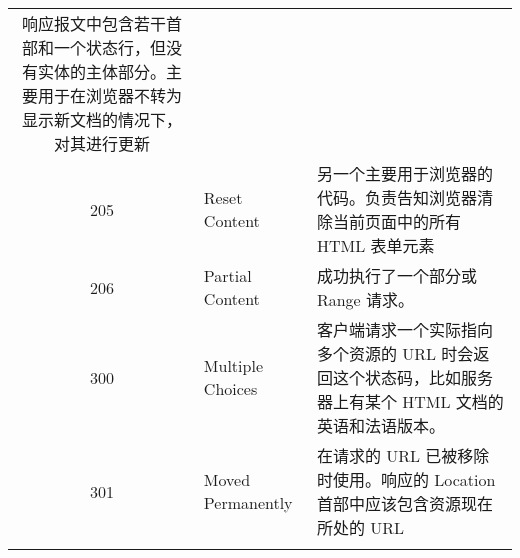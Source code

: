 \begin{longtable}[]{@{}cll@{}}
\begin{minipage}[t]{0.30\columnwidth}
响应报文中包含若干首部和一个状态行，但没有实体的主体部分。主要用于在浏览器不转为显示新文档的情况下，对其进行更新\strut
\end{minipage}\tabularnewline
\begin{minipage}[t]{0.32\columnwidth}\centering\strut
205\strut
\end{minipage} & \begin{minipage}[t]{0.30\columnwidth}\raggedright\strut
Reset Content\strut
\end{minipage} & \begin{minipage}[t]{0.30\columnwidth}\raggedright\strut
另一个主要用于浏览器的代码。负责告知浏览器清除当前页面中的所有 HTML
表单元素\strut
\end{minipage}\tabularnewline
\begin{minipage}[t]{0.32\columnwidth}\centering\strut
206\strut
\end{minipage} & \begin{minipage}[t]{0.30\columnwidth}\raggedright\strut
Partial Content\strut
\end{minipage} & \begin{minipage}[t]{0.30\columnwidth}\raggedright\strut
成功执行了一个部分或 Range 请求。\strut
\end{minipage}\tabularnewline
\begin{minipage}[t]{0.32\columnwidth}\centering\strut
300\strut
\end{minipage} & \begin{minipage}[t]{0.30\columnwidth}\raggedright\strut
Multiple Choices\strut
\end{minipage} & \begin{minipage}[t]{0.30\columnwidth}\raggedright\strut
客户端请求一个实际指向多个资源的 URL
时会返回这个状态码，比如服务器上有某个 HTML 文档的英语和法语版本。\strut
\end{minipage}\tabularnewline
\begin{minipage}[t]{0.32\columnwidth}\centering\strut
301\strut
\end{minipage} & \begin{minipage}[t]{0.30\columnwidth}\raggedright\strut
Moved Permanently\strut
\end{minipage} & \begin{minipage}[t]{0.30\columnwidth}\raggedright\strut
在请求的 URL 已被移除时使用。响应的 Location
首部中应该包含资源现在所处的 URL\strut
\end{minipage}\tabularnewline
\begin{minipage}[t]{0.32\columnwidth}\centering\strut

\end{minipage}
\end{longtable}
